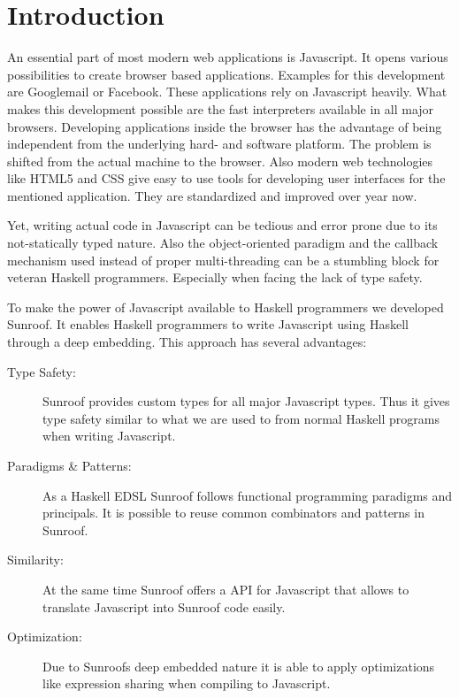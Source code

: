 \documentclass{llncs}
\begin{document}
\section{Introduction}

An essential part of most modern web applications is Javascript.
It opens various possibilities to create browser based applications.
Examples for this development are Googlemail or Facebook.
These applications rely on Javascript heavily. What makes this 
development possible are the fast interpreters available in all
major browsers. Developing applications inside the browser has
the advantage of being independent from the underlying hard- and
software platform. The problem is shifted from the actual machine
to the browser. Also modern web technologies like HTML5 and CSS
give easy to use tools for developing user interfaces for the
mentioned application. They are standardized and improved over year 
now. 

Yet, writing actual code in Javascript can be tedious and error prone 
due to its not-statically typed nature. Also the object-oriented
paradigm and the callback mechanism used instead of proper multi-threading 
can be a stumbling block for veteran Haskell programmers. Especially when
facing the lack of type safety.

To make the power of Javascript available to Haskell programmers 
we developed Sunroof. It enables Haskell programmers to write
Javascript using Haskell through a deep embedding. This 
approach has several advantages:

\begin{description}
\item[Type Safety:] Sunroof provides custom types for all major Javascript
types. Thus it gives type safety similar to what we are used to from 
normal Haskell programs when writing Javascript.
\item[Paradigms \& Patterns:] As a Haskell EDSL Sunroof follows functional programming 
paradigms and principals. It is possible to reuse common combinators and 
patterns in Sunroof.
\item[Similarity:] At the same time Sunroof offers a API for Javascript 
that allows to translate Javascript into Sunroof code easily.
\item[Optimization:] Due to Sunroofs deep embedded nature it is able
to apply optimizations like expression sharing when compiling to Javascript.
\end{description}

\end{document}
